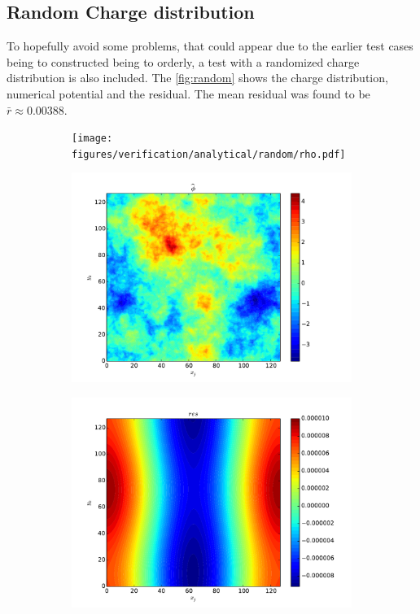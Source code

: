 	\subsection{Random Charge distribution}
		To hopefully avoid some problems, that could appear due to the earlier test
		cases being to constructed being to orderly, a test with a randomized
		charge distribution is also included. The \cref{fig:random} shows the
		charge distribution, numerical potential and the residual. The mean residual was
			found to be \(\bar{r} \approx 0.00388\).
		\begin{figure}
			\centering
			\begin{subfigure}[b]{0.32\textwidth}
				\texttt{[image: figures/verification/analytical/random/rho.pdf]}
			\end{subfigure}
			\begin{subfigure}[b]{0.32\textwidth}
				\includegraphics[width = \textwidth]{figures/verification/analytical/random/numerical.pdf}
			\end{subfigure}
			\begin{subfigure}[b]{0.32\textwidth}
				\includegraphics[width = \textwidth]{figures/verification/analytical/random/residual.pdf}

\end{subfigure}
\end{figure}
